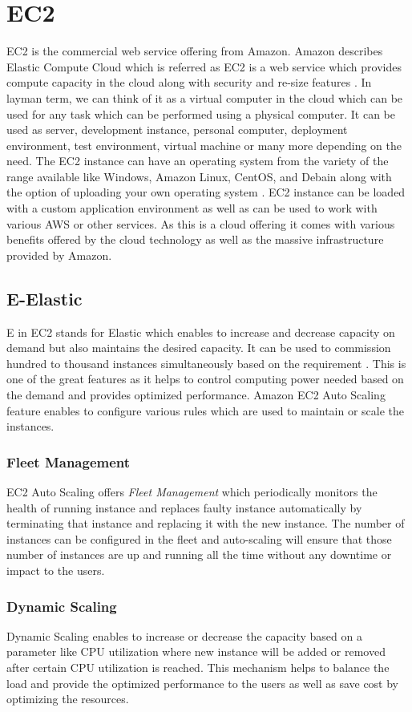 \section{EC2}
EC2 is the commercial web service offering from Amazon. Amazon describes Elastic Compute Cloud which is referred as EC2 is a web service which provides compute capacity in the cloud along with security and re-size features \cite{www-aws-ec2}. In layman term, we can think of it as a virtual computer in the cloud which can be used for any task which can be performed using a physical computer. It can be used as server, development instance, personal computer, deployment environment, test environment, virtual machine or many more depending on the need. The EC2 instance can have an operating system from the variety of the range available like Windows, Amazon Linux, CentOS, and Debain along with the option of uploading your own operating system \cite{www-aws-ec2-details}. EC2 instance can be loaded with a custom application environment as well as can be used to work with various AWS or other services. As this is a cloud offering it comes with various benefits offered by the cloud technology as well as the massive infrastructure provided by Amazon.

\subsection{E-Elastic}
E in EC2 stands for Elastic which enables to increase and decrease capacity on demand but also maintains the desired capacity. It can be used to commission hundred to thousand instances simultaneously based on the requirement \cite{www-aws-ec2}. This is one of the great features as it helps to control computing power needed based on the demand and provides optimized performance. 
Amazon EC2 Auto Scaling \cite{www-aws-ec2autoscaling} feature enables to configure various rules which are used to maintain or scale the instances. 
\subsubsection{Fleet Management}
EC2 Auto Scaling offers \emph{Fleet Management} which periodically monitors the health of running instance and replaces faulty instance automatically by terminating that instance and replacing it with the new instance. The number of instances can be configured in the fleet and auto-scaling will ensure that those number of instances are up and running all the time without any downtime or impact to the users.
\subsubsection{Dynamic Scaling}
Dynamic Scaling enables to increase or decrease the capacity based on a parameter like CPU utilization where new instance will be added or removed after certain CPU utilization is reached. This mechanism helps to balance the load and provide the optimized performance to the users as well as save cost by optimizing the resources.

